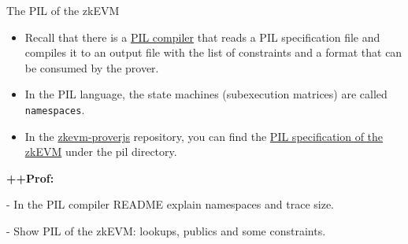 \begin{frame}{The PIL of the zkEVM}
\begin{itemize}
\item Recall that there is a \href{https://github.com/0xPolygonHermez/pilcom}{PIL compiler} that reads a PIL specification file and compiles it to an output file with the list of constraints and a format that can be consumed by the prover.
\item In the PIL language, the state machines (subexecution matrices) are called \texttt{namespaces}.
\item In the \href{https://github.com/0xPolygonHermez/zkevm-proverjs}{zkevm-proverjs} repository, you can find the \href{https://github.com/0xPolygonHermez/zkevm-proverjs/tree/main/pil}{PIL specification of the zkEVM} under the pil directory.
\end{itemize}

\ifPROF
\vspace{0.2cm}
\footnotesize
\textbf{++Prof:} 

- In the PIL compiler README explain namespaces and trace size.

- Show PIL of the zkEVM: lookups, publics and some constraints.
\fi
\end{frame}




